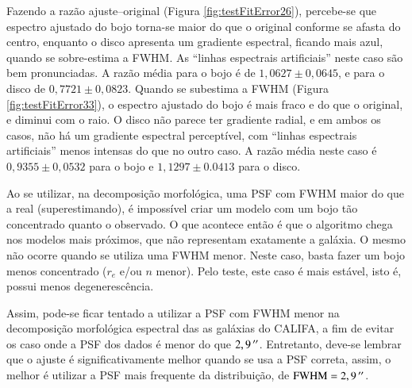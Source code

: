 Fazendo a razão ajuste--original (Figura \ref{fig:testFitError26}), percebe-se
que espectro ajustado do bojo torna-se maior do que o original conforme se
afasta do centro, enquanto o disco apresenta um gradiente espectral, ficando
mais azul, quando se sobre-estima a FWHM. As ``linhas espectrais artificiais''
neste caso são bem pronunciadas. A razão média para o bojo é de $1,0627 \pm
0,0645$, e para o disco de $0,7721 \pm 0,0823$. Quando se subestima a FWHM
(Figura \ref{fig:testFitError33}), o espectro ajustado do bojo é mais fraco e do
que o original, e diminui com o raio. O disco não parece ter gradiente radial, e
em ambos os casos, não há um gradiente espectral perceptível, com ``linhas
espectrais artificiais'' menos intensas do que no outro caso. A razão média
neste caso é $0,9355 \pm 0,0532$ para o bojo e $1,1297 \pm 0.0413$ para o disco.

Ao se utilizar, na decomposição morfológica, uma PSF com FWHM maior do que a
real (superestimando), é impossível criar um modelo com um bojo tão concentrado
quanto o observado. O que acontece então é que o algoritmo chega nos modelos
mais próximos, que não representam exatamente a galáxia. O mesmo não ocorre
quando se utiliza uma FWHM menor. Neste caso, basta fazer um bojo menos
concentrado ($r_e$ e/ou $n$ menor). Pelo teste, este caso é mais estável, isto
é, possui menos degenerescência.

Assim, pode-se ficar tentado a utilizar a PSF com FWHM menor na decomposição
morfológica espectral das as galáxias do CALIFA, a fim de evitar os caso onde a
PSF dos dados é menor do que $2,9\,^{\prime\prime}$. Entretanto, deve-se lembrar que o
ajuste é significativamente melhor quando se usa a PSF correta, assim, o melhor
é utilizar a PSF mais frequente da distribuição, de $\mathrm{FWHM} =
2,9\,^{\prime\prime}$.


